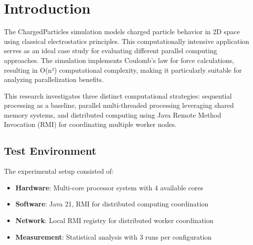 \documentclass[sigconf]{acmart}
\begin{document}


\maketitle

\section{Introduction}

The ChargedParticles simulation models charged particle behavior in 2D space using classical electrostatics principles. This computationally intensive application serves as an ideal case study for evaluating different parallel computing approaches. The simulation implements Coulomb's law for force calculations, resulting in O(n²) computational complexity, making it particularly suitable for analyzing parallelization benefits.

This research investigates three distinct computational strategies: sequential processing as a baseline, parallel multi-threaded processing leveraging shared memory systems, and distributed computing using Java Remote Method Invocation (RMI) for coordinating multiple worker nodes.

\subsection{Test Environment}
The experimental setup consisted of:
\begin{itemize}
    \item \textbf{Hardware}: Multi-core processor system with 4 available cores
    \item \textbf{Software}: Java 21, RMI for distributed computing coordination
    \item \textbf{Network}: Local RMI registry for distributed worker coordination
    \item \textbf{Measurement}: Statistical analysis with 3 runs per configuration
\end{itemize}
\end{document}
